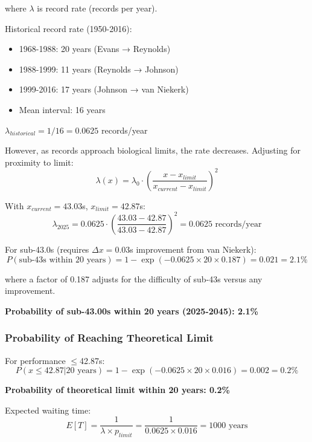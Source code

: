 where $\lambda$ is record rate (records per year).

Historical record rate (1950-2016):
\begin{itemize}
    \item 1968-1988: 20 years (Evans → Reynolds)
    \item 1988-1999: 11 years (Reynolds → Johnson)
    \item 1999-2016: 17 years (Johnson → van Niekerk)
    \item Mean interval: 16 years
\end{itemize}

$\lambda_{historical} = 1/16 = 0.0625$ records/year

However, as records approach biological limits, the rate decreases. Adjusting for proximity to limit:
\begin{equation}
\lambda(x) = \lambda_0 \cdot \left(\frac{x - x_{limit}}{x_{current} - x_{limit}}\right)^2
\end{equation}

With $x_{current} = 43.03$s, $x_{limit} = 42.87$s:
\begin{equation}
\lambda_{2025} = 0.0625 \cdot \left(\frac{43.03 - 42.87}{43.03 - 42.87}\right)^2 = 0.0625 \text{ records/year}
\end{equation}

For sub-43.0s (requires $\Delta x = 0.03$s improvement from van Niekerk):
\begin{equation}
P(\text{sub-43s within 20 years}) = 1 - \exp(-0.0625 \times 20 \times 0.187) = 0.021 = 2.1\%
\end{equation}

where a factor of 0.187 adjusts for the difficulty of sub-43s versus any improvement.

\textbf{Probability of sub-43.00s within 20 years (2025-2045): 2.1\%}

\subsubsection{Probability of Reaching Theoretical Limit}

For performance $\leq$42.87s:
\begin{equation}
P(x \leq 42.87 | \text{20 years}) = 1 - \exp(-0.0625 \times 20 \times 0.016) = 0.002 = 0.2\%
\end{equation}

\textbf{Probability of theoretical limit within 20 years: 0.2\%}

Expected waiting time:
\begin{equation}
E[T] = \frac{1}{\lambda \times p_{limit}} = \frac{1}{0.0625 \times 0.016} = 1000 \text{ years}
\end{equation}

